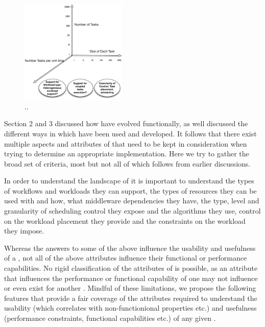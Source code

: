 \documentclass{sig-alternate}
\begin{document}
\begin{figure}[t]
	\centering
		\includegraphics[width=0.45\textwidth]{figures/pilot-criteria}
                \caption{..}
\end{figure}




Section 2 and 3 discussed how \pilotjobs have evolved functionally, as
well discussed the different ways in which \pilotjobs have been
used and developed. It follows that there exist multiple aspects and
attributes of \pilotjobs that need to be kept in consideration when
trying to determine an appropriate implementation.  Here we try to
gather the broad set of criteria, most but not all of which follows
from earlier discussions.

In order to understand the landscape of \pilotjobs it is important to
understand the types of workflows and workloads they can support, the
types of resources they can be used with and how, what middleware
dependencies they have, the type, level and granularity of scheduling
control they expose and the algorithms they use, control on the
workload placement they provide and the
constraints on the workload they impose. 

Whereas the answers to some of the above influence the usability and
usefulness of a \pilotjob, not all of the above attributes influence
their functional or performance capabilities.   No rigid classification of the attributes of
\pilotjobs is possible, as an attribute that influences the
performance or functional capability of one \pilotjob may not
influence or even exist for another \pilotjob. Mindful of these
limitations, we propose the following features that provide a fair
coverage of the attributes required to understand the usability (which
correlates with non-functionional properties etc.)  and usefulness
(performance constraints, functional capabilities etc.)  of any given
\pilotjob. 
\end{document}
